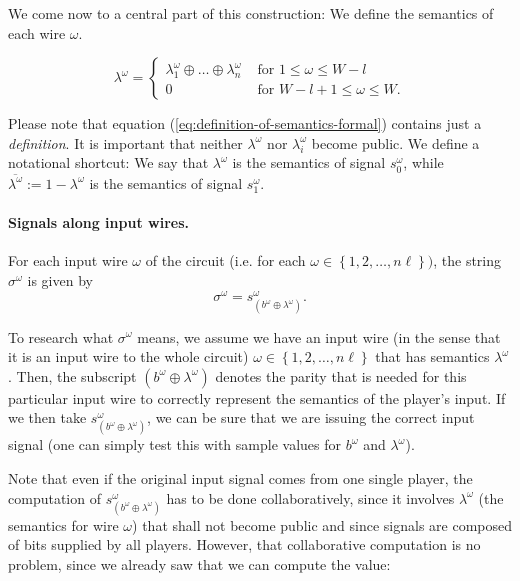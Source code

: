 We come now to a central part of this construction: We define the semantics of each wire $\omega$.

\begin{equation}
  \label{eq:definition-of-semantics-formal}
  \lambda^\omega= 
  \begin{cases}
    \lambda_{1}^\omega\oplus\dots\oplus\lambda_{n}^\omega & \text{ for } 1\leq\omega\leq W-l \\
    0 & \text{ for } W-l+1\leq\omega\leq W.
  \end{cases}
\end{equation}

Please note that equation (\ref{eq:definition-of-semantics-formal}) contains just a \emph{definition}. It is important that neither $\lambda^\omega$ nor $\lambda_i^\omega$ become public. We define a notational shortcut: We say that $\lambda^\omega$ is the semantics of signal $s_0^\omega$, while $\overline{\lambda^\omega}:=1-\lambda^\omega$ is the semantics of signal $s_1^\omega$.

\paragraph{Signals along input wires.}

For each input wire $\omega$ of the circuit (i.e. for each $\omega \in \left\{ 1,2,\dots,n\ell\right\})$, the string $\sigma^\omega$ is given by
  \begin{equation}
    \label{eq:sigma-superscript-omega-definition}
    \sigma^\omega=s_{(b^\omega\oplus\lambda^\omega)}^\omega.
  \end{equation}

To research what $\sigma^\omega$ means, we assume we have an input wire (in the sense that it is an input wire to the whole circuit) $\omega\in\left\{ 1,2,\dots,n\ell \right\}$ that has semantics $\lambda^\omega$. Then, the subscript $(b^\omega\oplus\lambda^\omega)$ denotes the parity that is needed for this particular input wire to correctly represent the semantics of the player's input. If we then take $s_{(b^\omega\oplus\lambda^\omega)}^\omega$, we can be sure that we are issuing the correct input signal (one can simply test this with sample values for $b^\omega$ and $\lambda^\omega$).

Note that even if the original input signal comes from one single player, the computation of $s_{(b^\omega\oplus\lambda^\omega)}^\omega$ has to be done collaboratively, since it involves $\lambda^\omega$ (the semantics for wire $\omega$) that shall not become public and since signals are composed of bits supplied by all players. However, that collaborative computation is no problem, since we already saw that we can compute the value:

